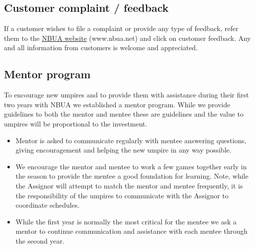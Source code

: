 \documentclass[letterpaper,11pt,colorlinks=true,allcolors=blue]{article}
\begin{document}
\subsection*{Customer complaint / feedback} 
If a customer wishes to file a complaint or provide any type of feedback, refer them to the \href{http://www.nbua.net/}{NBUA website} (www.nbua.net) and click on customer feedback. Any and all information from customers is welcome and appreciated.

\subsection*{Mentor program} 
To encourage new umpires and to provide them with assistance during their first two years with NBUA we established a mentor program. While we provide guidelines to both the mentor and mentee these are guidelines and the value to umpires will be proportional to the investment.
\begin{itemize}
\item  Mentor is asked to communicate regularly with mentee answering questions, giving encouragement and helping the new umpire in any way possible.
\item  We encourage the mentor and mentee to work a few games together early in the season to provide the mentee a good foundation for learning. Note, while the Assignor will attempt to match the mentor and mentee frequently, it is the responsibility of the umpires to communicate with the Assignor to coordinate schedules.
\item While the first year is normally the most critical for the mentee we ask a mentor to continue communication and assistance with each mentee through the second year.
\end{itemize}

\newpage
\end{document}

